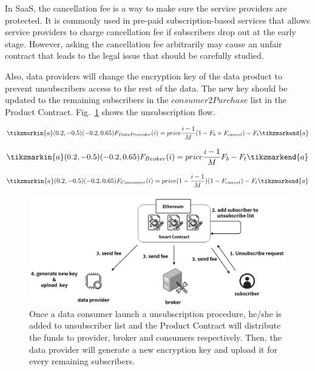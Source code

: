 \begin{spacing}{2.0}
In SaaS, the cancellation fee is a way to make sure the service providers are protected. It is commonly used in pre-paid subscription-based services that allows service providers to charge cancellation fee if subscribers drop out at the early stage. However, asking the cancellation fee arbitrarily may cause an unfair contract that leads to the legal issue that should be carefully studied.

Also, data providers will change the encryption key of the data product to prevent unsubscribers access to the rest of the data. The new key should be updated to the remaining subscribers in the $consumer2Purchase$ list in the Product Contract. Fig.~\ref{fig:unsubscribe} shows the unsubscription flow.

\begin{equation}\tikzmarkin{a}(0.2,-0.5)(-0.2,0.65)
\label{equation:unsubscribe_provider}
    F_{DataProvider}(i) = price \frac{i-1}{M} (1-F_{b}+F_{cancel}) -F_{t}
    \tikzmarkend{a}
\end{equation}

\begin{equation}\tikzmarkin{a}(0.2,-0.5)(-0.2,0.65)
\label{equation:unsubscribe_broker}
    F_{Broker}(i) = price \frac{i-1}{M} F_{b} -F_{t}
    \tikzmarkend{a}
\end{equation}

\begin{equation}\tikzmarkin{a}(0.2,-0.5)(-0.2,0.65)
\label{equation:unsubscribe_consumer}
    F_{Consumer}(i) = price (1-\frac{i-1}{M})(1 -F_{cancel}) -F_{t}
    \tikzmarkend{a}
\end{equation}

\begin{figure}[h]
    \centering
    \includegraphics[width=5.5in]{img/unsubscribe}
    \caption{Once a data consumer launch a unsubscription procedure, he/she is added to unsubscriber list and the Product Contract will distribute the funds to provider, broker and consumers respectively. Then, the data provider will generate a new encryption key and upload it for every remaining subscribers.}
    \label{fig:unsubscribe}
\end{figure}
\clearpage


\end{spacing}
